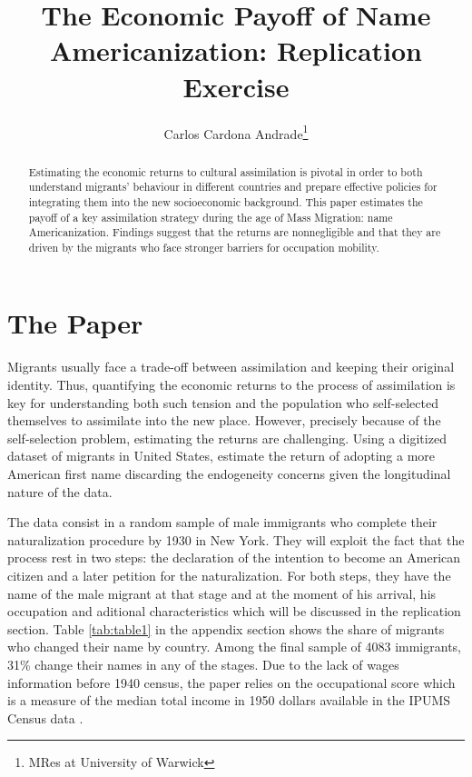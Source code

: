\documentclass[12pt]{article}
\begin{document}
	
	
	\title{The Economic Payoff of
		Name Americanization: Replication Exercise}

	\author{Carlos Cardona Andrade\thanks{MRes at University of Warwick } } 


	\maketitle
	\begin{abstract}
		
		
Estimating the economic returns to cultural assimilation is pivotal in order to both understand migrants' behaviour in different countries and prepare effective policies for integrating them into the new socioeconomic background. This paper estimates the payoff of a key assimilation strategy during the age of Mass Migration: name Americanization. Findings suggest that the returns are nonnegligible and that they are driven by the migrants who face stronger barriers for occupation mobility.
		

		
	\end{abstract}
	


\onehalfspacing


\section{The Paper}

Migrants usually face a trade-off between assimilation and keeping their original identity. Thus, quantifying the economic returns to the process of assimilation is key for understanding both such tension and the population who self-selected themselves to assimilate into the new place. However, precisely because of the self-selection problem, estimating the returns are challenging. Using a digitized dataset of migrants in United States,  \cite{biavaschi2017economic} estimate the return of adopting a more American first name discarding the endogeneity concerns given the longitudinal nature of the data.  

\medskip

The data consist in a random sample of male immigrants who complete their naturalization procedure by 1930 in New York. They will exploit the fact that the process rest in two steps: the declaration of the intention to become an American citizen and a later petition for the naturalization. For both steps, they have the name of the male migrant at that stage and at the moment of his arrival, his occupation and aditional characteristics which will be discussed in the replication section. Table \ref{tab:table1} in the appendix section shows the share of migrants who changed their name by country. Among the final sample of 4083 immigrants, 31\% change their names in any of the stages. Due to the lack of wages information before 1940 census, the paper relies on the occupational score which is a measure of the median total income in 1950 dollars available in the IPUMS Census data \citep{ruggles2015integrated}.
\end{document}
